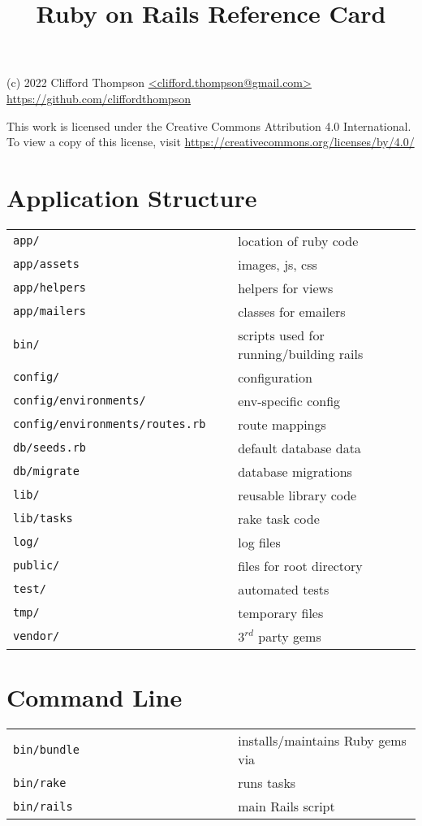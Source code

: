 \documentclass[6pt]{article}
\begin{document}
\raggedright
\footnotesize
\begin{multicols}{3}

  \title{Ruby on Rails Reference Card}

  {\scriptsize
    (c) 2022 Clifford Thompson \url{<clifford.thompson@gmail.com>}\\
    \url{https://github.com/cliffordthompson}

    This work is licensed under the Creative Commons Attribution 4.0 International.
    To view a copy of this license, visit
    \url{https://creativecommons.org/licenses/by/4.0/}
  }

  \section{Application Structure}
  \begin{tabular}{L{0.55\linewidth} L{0.45\linewidth}}
    \tt app/ & location of ruby code \\
    \tt app/assets &  images, js, css \\
    \tt app/helpers &  helpers for views \\
    \tt app/mailers &  classes for emailers \\
    \tt bin/ & scripts used for running/building rails \\
    \tt config/ & configuration \\
    \tt config/environments/ & env-specific config \\
    \tt config/environments/routes.rb & route mappings \\
    \tt db/seeds.rb & default database data\\
    \tt db/migrate & database migrations\\
    \tt lib/ & reusable library code\\
    \tt lib/tasks & rake task code\\
    \tt log/ & log files\\
    \tt public/ & files for root directory \\
    \tt test/ & automated tests \\
    \tt tmp/ & temporary files\\
    \tt vendor/ & $3^{rd}$ party gems\\
  \end{tabular}

  \section{Command Line}
  \begin{tabular}{L{0.55\linewidth} L{0.45\linewidth}}
    \tt bin/bundle & installs/maintains Ruby gems via \\
    \tt bin/rake & runs tasks\\
    \tt bin/rails & main Rails script\\
  \end{tabular}

\end{multicols}
\end{document}
